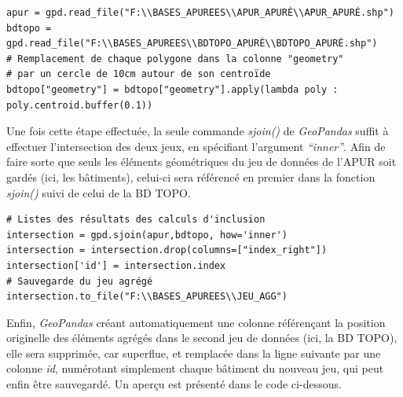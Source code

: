 \documentclass[
  11pt,
  french,
]{article}
\begin{document}
\begin{tcolorbox}[title= Chargement des données et calcul des centroïdes ,colback=boitecode]
\begin{lstlisting}[style=code]
apur = gpd.read_file("F:\\BASES_APUREES\\APUR_APURÉ\\APUR_APURÉ.shp")
bdtopo = gpd.read_file("F:\\BASES_APUREES\\BDTOPO_APURÉ\\BDTOPO_APURÉ.shp")
# Remplacement de chaque polygone dans la colonne "geometry"
# par un cercle de 10cm autour de son centroïde
bdtopo["geometry"] = bdtopo["geometry"].apply(lambda poly : poly.centroid.buffer(0.1))\end{lstlisting}
\end{tcolorbox}

Une fois cette étape effectuée, la seule commande \emph{sjoin()} de
\emph{GeoPandas} suffit à effectuer l'intersection des deux jeux, en
spécifiant l'argument \emph{``inner''}. Afin de faire sorte que seuls
les éléments géométriques du jeu de données de l'APUR soit gardés (ici,
les bâtiments), celui-ci sera référencé en premier dans la fonction
\emph{sjoin()} suivi de celui de la BD TOPO.

\begin{tcolorbox}[title= Calculs d'inclusion géométrique et sauvegarde du jeu agrégé ,colback=boitecode]
\begin{lstlisting}[style=code]
# Listes des résultats des calculs d'inclusion
intersection = gpd.sjoin(apur,bdtopo, how='inner')
intersection = intersection.drop(columns=["index_right"])
intersection['id'] = intersection.index
# Sauvegarde du jeu agrégé
intersection.to_file("F:\\BASES_APUREES\\JEU_AGG")\end{lstlisting}
\end{tcolorbox}

Enfin, \emph{GeoPandas} créant automatiquement une colonne référençant
la position originelle des éléments agrégés dans le second jeu de
données (ici, la BD TOPO), elle sera supprimée, car superflue, et
remplacée dans la ligne suivante par une colonne \emph{id}, numérotant
simplement chaque bâtiment du nouveau jeu, qui peut enfin être
sauvegardé. Un aperçu est présenté dans le code ci-dessous.\\
\end{document}
